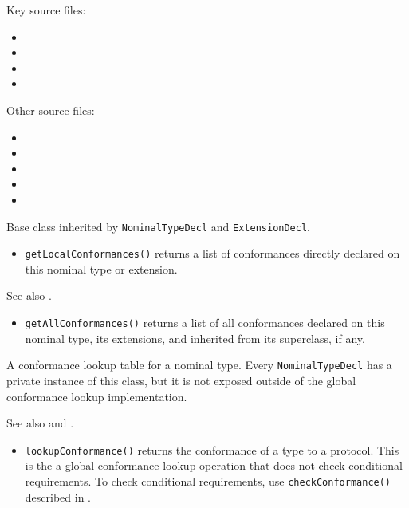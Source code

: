 \documentclass[../generics]{subfiles}
\begin{document}
Key source files:
\begin{itemize}
\item {}
\item {}
\item {}
\item {}
\end{itemize}
Other source files:
\begin{itemize}
\item {}
\item {}
\item {}
\item {}
\item {}
\end{itemize}

Base class inherited by \texttt{NominalTypeDecl} and \texttt{ExtensionDecl}.
\begin{itemize}
\item \texttt{getLocalConformances()} returns a list of conformances directly declared on this nominal type or extension.
\end{itemize}

See also .
\begin{itemize}
\item \texttt{getAllConformances()} returns a list of all conformances declared on this nominal type, its extensions, and inherited from its superclass, if any.
\end{itemize}

A conformance lookup table for a nominal type. Every \texttt{NominalTypeDecl} has a private instance of this class, but it is not exposed outside of the global conformance lookup implementation.

See also  and .
\begin{itemize}
\item \texttt{lookupConformance()} returns the conformance of a type to a protocol. This is the a global conformance lookup operation that does not check conditional requirements. To check conditional requirements, use \texttt{checkConformance()} described in .
\end{itemize}
\end{document}
